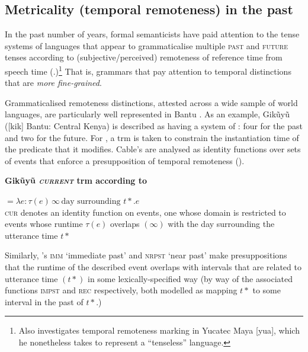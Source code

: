 \subsection{Metricality (temporal remoteness) in the past}\label{metr-sec}

In the past number of years, formal semanticists have paid attention to the tense systems of languages that appear to grammaticalise multiple \textsc{past} and \textsc{future} tenses according to (subjective/perceived) remoteness of reference time from speech time (\citealp[\textit{e.g.},][]{Cable2013,Klecha2016,Hayashi2015,Mucha2015}.)\footnote{Also \citealp{Bohnemeyer2018} investigates temporal remoteness marking in Yucatec Maya [\gls{yua}], which he nonetheless takes to represent a ``tenseless'' language.} That is, grammars that pay attention to temporal distinctions that are \textit{more fine-grained}.

Grammaticalised remoteness distinctions, attested across a wide sample of world languages, are particularly well represented in Bantu \citep{Dahl1983,Botne2012,Mucha2017,Mucha2017a}. As an example, Gikũyũ ([\gls{kik}] Bantu: Central Kenya) is described as having a system of : four for the past and two for the future. For \citet{Cable2013}, a \acrshort{trm} is taken to constrain the instantiation time of the predicate that it modifies. Cable's  are analysed as identity functions over sets of events that enforce a presupposition of temporal remoteness (\nextx).

\pex \textbf{Gikũyũ \textsc{\textit{current}} \acrlong{trm} according to \citet{Cable2013}}


$ =\lambda e:\tau(e)\,\infty\,\text{day surrounding }t\!*\mathbin{.}e $\\
\textsc{cur} denotes an identity function on events, one whose domain is restricted to events whose runtime $ \tau(e) $ overlaps $ (\infty) $ with the day surrounding the utterance time $ t* $
\xe

Similarly, \citeauthor{Cable2013}'s \textsc{imm} `immediate past' and \textsc{nrpst} `near past' make presuppositions that the runtime of the described event overlaps with intervals that are related to utterance time $ (t*) $ in some lexically-specified way (by way of the associated functions \textsf{\textsc{impst}} and \textsf{\textsc{rec}} respectively, both modelled as mapping $ t* $ to some interval in the past of $ t* $.)



